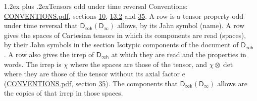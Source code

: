 \documentclass[10pt,a4paper]{article}
\makeatletter
\renewcommand\section{\@startsection{section}{1}{\z@}{-3ex plus -1ex minus -.2ex}%
  {1.2ex plus .2ex}{\normalfont\large\sffamily\bfseries\color{parttitle}}}
\numberwithin{equation}{section}
\newcommand{\grp}[1]{\mathsf{#1}}
\newcommand{\irrprod}{\otimes}
\makeatother
\begin{document}
\section{Tensors odd under time reversal}\label{s:time_odd}
Conventions: \href{../../CONVENTIONS.pdf}{CONVENTIONS.pdf}, sections \href{../../../rotation/CONVENTIONS.pdf\#conv.10}{10}, \href{../../../rotation/CONVENTIONS.pdf\#conv.13.2}{13.2} and \href{../../CONVENTIONS.pdf\#conv.35}{35}.
\leavevmode\label{n:head.name.property}A row is a tensor property odd under time reversal that $\grp{D_{\infty h}}(\grp{D_{\infty}})$ allows, by its Jahn symbol (name). \label{n:head.spaces}A row gives the spaces of Cartesian tensors in which its components are read (spaces), by their Jahn symbols in the section Isotypic components of the document of \href{../../../rotation/data/pdf/Dinfh.pdf}{$\grp{D_{\infty h}}$}. \label{n:head.irrep}\label{n:head.properties}A row also gives the irrep of $\grp{D_{\infty h}}$ at which they are read and the properties in words. The irrep is $\chi$ where the spaces are those of the tensor, and $\chi \irrprod \det$ where they are those of the tensor without its axial factor e (\href{../../CONVENTIONS.pdf}{CONVENTIONS.pdf}, section \href{../../CONVENTIONS.pdf\#conv.35}{35}). The components that $\grp{D_{\infty h}}(\grp{D_{\infty}})$ allows are the copies of that irrep in those spaces.
\end{document}
